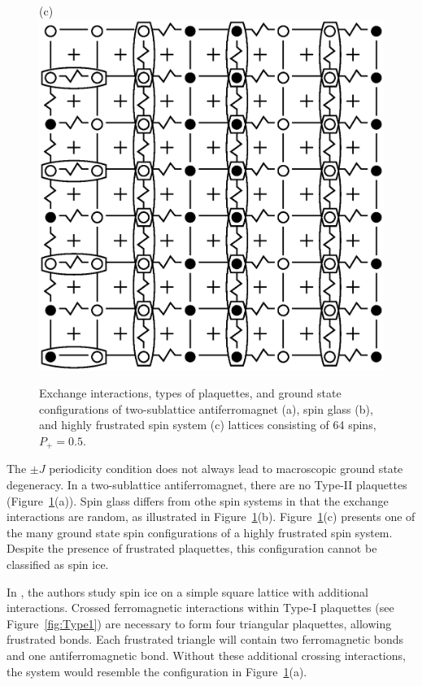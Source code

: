 \documentclass[preprint,12pt]{elsarticle}
\begin{document}
\begin{figure}[H]
\begin{minipage}[h]{0.3\linewidth}
		\end{minipage}
		\hfill
		\begin{minipage}[h]{0.3\linewidth}
			\centering(c)
			\includegraphics[width=1\linewidth]{pictures/SI_64_J0}
		\end{minipage}
		\hfill
		\caption{Exchange interactions, types of plaquettes, and ground state configurations of two-sublattice antiferromagnet (a), spin glass (b), and highly frustrated spin system (c) lattices consisting of 64 spins, $P_+ = 0.5$.}
		\label{fig:cell_SI_SG_64}
		
	\end{figure}
	

	The $\pm J$ periodicity condition does not always lead to macroscopic ground state degeneracy. In a two-sublattice antiferromagnet, there are no Type-II plaquettes (Figure~\ref{fig:cell_SI_SG_64}(a)).
	Spin glass differs from othe spin systems in that the exchange interactions are random, as illustrated in Figure~\ref{fig:cell_SI_SG_64}(b).
	Figure~\ref{fig:cell_SI_SG_64}(c) presents one of the many ground state spin configurations of a highly frustrated spin system. Despite the presence of frustrated plaquettes, this configuration cannot be classified as spin ice.

	In \cite{grigera2018entropy}, the authors study spin ice on a simple square lattice with additional interactions. Crossed ferromagnetic interactions within Type-I plaquettes (see Figure~\ref{fig:Type1}) are necessary to form four triangular plaquettes, allowing frustrated bonds. Each frustrated triangle will contain two ferromagnetic bonds and one antiferromagnetic bond. Without these additional crossing interactions, the system would resemble the configuration in Figure~\ref{fig:cell_SI_SG_64}(a).
\end{document}
